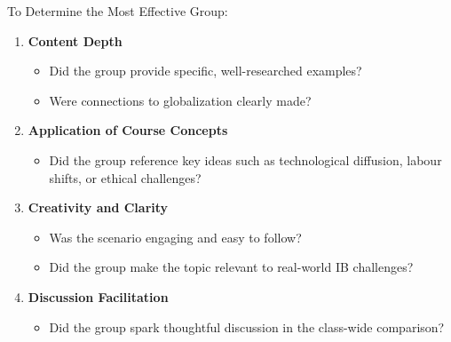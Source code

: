 \documentclass[
  11pt,
]{article}
\providecommand{\tightlist}{%
  \setlength{\itemsep}{0pt}\setlength{\parskip}{0pt}}
\begin{document}
To Determine the Most Effective Group:

\begin{enumerate}
\def\labelenumi{\arabic{enumi}.}
\tightlist
\item
  \textbf{Content Depth}

  \begin{itemize}
  \tightlist
  \item
    Did the group provide specific, well-researched examples?\\
  \item
    Were connections to globalization clearly made?
  \end{itemize}
\item
  \textbf{Application of Course Concepts}

  \begin{itemize}
  \tightlist
  \item
    Did the group reference key ideas such as technological diffusion,
    labour shifts, or ethical challenges?
  \end{itemize}
\item
  \textbf{Creativity and Clarity}

  \begin{itemize}
  \tightlist
  \item
    Was the scenario engaging and easy to follow?\\
  \item
    Did the group make the topic relevant to real-world IB challenges?
  \end{itemize}
\item
  \textbf{Discussion Facilitation}

  \begin{itemize}
  \tightlist
  \item
    Did the group spark thoughtful discussion in the class-wide
    comparison?
  \end{itemize}
\end{enumerate}


\printbibliography
\end{document}
